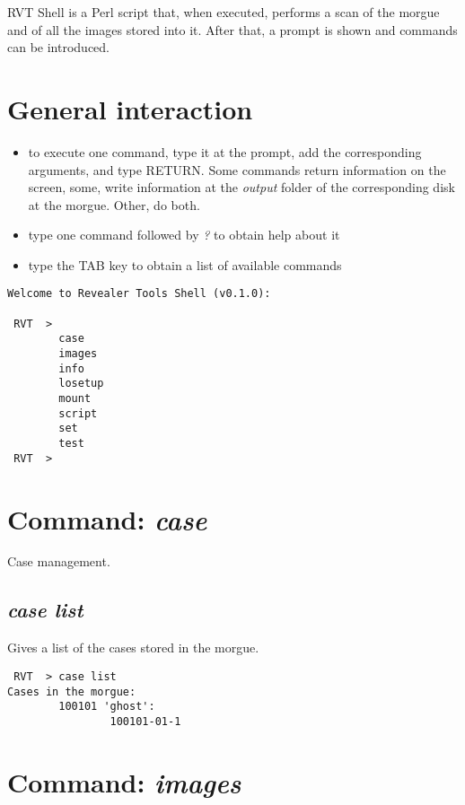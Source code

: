 \documentclass[a4paper,11pt,oneside]{report}
\begin{document}
RVT Shell is a Perl script that, when executed, performs a scan of the morgue and of all the images stored into it. After that, a prompt is shown and commands can be introduced.



\section{General interaction}

\begin{itemize}
\item to execute one command, type it at the prompt, add the corresponding arguments, and type RETURN. Some commands return information on the screen, some, write information at the \emph{output} folder of the corresponding disk at the morgue. Other, do both.

\item type one command followed by \emph{?} to obtain help about it

\item type the TAB key to obtain a list of available commands

\end{itemize}

\begin{verbatim}
Welcome to Revealer Tools Shell (v0.1.0):

 RVT  > 
        case
        images
        info
        losetup
        mount
        script
        set
        test
 RVT  > 
\end{verbatim}


\section{Command: \emph{case}}

Case management.

\subsection{\emph{case list}}

Gives a list of the cases stored in the morgue.

\begin{verbatim}
 RVT  > case list
Cases in the morgue: 
        100101 'ghost':
                100101-01-1

 \end{verbatim}



\section{Command: \emph{images}}
\end{document}
